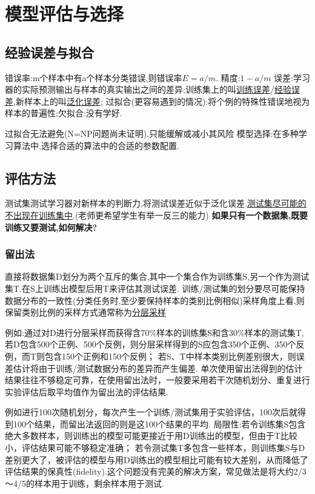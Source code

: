 \section{模型评估与选择}
\subsection{经验误差与拟合}
\myitem 错误率:m个样本中有a个样本分类错误,则错误率$E=a/m$.
\myitem 精度:$1-a/m$
\myitem 误差:学习器的实际预测输出与样本的真实输出之间的差异;训练集上的叫\underline{训练误差}/\underline{经验误差},新样本上的叫\underline{泛化误差};
\myitem 过拟合(更容易遇到的情况):将个例的特殊性错误地视为样本的普遍性;欠拟合:没有学好.
\par 过拟合无法避免(N=NP问题尚未证明),只能缓解或减小其风险
\myitem 模型选择:在多种学习算法中,选择合适的算法中的合适的参数配置.
\subsection{评估方法}
\myitem 测试集测试学习器对新样本的判断力,将测试误差近似于泛化误差.\underline{测试集尽可能的不出现在训练集中}.(老师更希望学生有举一反三的能力)
\myitem \textbf{如果只有一个数据集,既要训练又要测试,如何解决?}
\subsubsection{留出法}
直接将数据集D划分为两个互斥的集合,其中一个集合作为训练集S,另一个作为测试集T.在S上训练出模型后用T来评估其测试误差.
\myitem 训练/测试集的划分要尽可能保持数据分布的一致性(分类任务时,至少要保持样本的类别比例相似)采样角度上看,则保留类别比例的采样方式通常称为\underline{分层采样}\par
例如:通过对D进行分层采样而获得含70\%样本的训练集S和含30\%样本的测试集T,
若D包含500个正例、500个反例，则分层采样得到的S应包含350个正例、350个反例，而T则包含150个正例和150个反例；
若S、T中样本类别比例差别很大，则误差估计将由于训练/测试数据分布的差异而产生偏差.
\myitem 单次使用留出法得到的估计结果往往不够稳定可靠，在使用留出法时，一般要采用若干次随机划分、重复进行实验评估后取平均值作为留出法的评估结果.\par
例如进行100次随机划分，每次产生一个训练/测试集用于实验评估，100次后就得到100个结果，而留出法返回的则是这100个结果的平均.
\myitem 局限性:若令训练集S包含绝大多数样本，则训练出的模型可能更接近于用D训练出的模型，但由于T比较小，评估结果可能不够稳定准确；
若令测试集T多包含一些样本，则训练集S与D差别更大了，被评估的模型与用D训练出的模型相比可能有较大差别，从而降低了评估结果的保真性(fidelity).这个问题没有完美的解决方案，常见做法是将大约2/3～4/5的样本用于训练，剩余样本用于测试.

